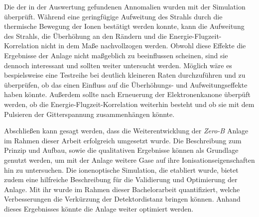Die der in der Auswertung gefundenen Annomalien wurden mit der Simulation überprüft. Während eine geringfügige Aufweitung des Strahls durch die thermische Bewegung der Ionen bestätigt werden konnte, kann die Aufweitung des Strahls, die Überhöhung an den Rändern und die Energie-Flugzeit-Korrelation nicht in dem Maße nachvollzogen werden. Obwohl diese Effekte die Ergebnisse der Anlage nicht maßgeblich zu beeinflussen scheinen, sind sie dennoch interessant und sollten weiter untersucht werden. Möglich wäre es bespielsweise eine Testreihe bei deutlich kleineren Raten durchzuführen und zu überprüfen, ob das einen Einfluss auf die Überhöhungs- und Aufweitungseffekte haben könnte. Außerdem sollte nach Erneuerung der Elektronenkanone überpüft werden, ob die Energie-Flugzeit-Korrelation weiterhin besteht und ob sie mit dem Pulsieren der Gitterspannung zusammenhängen könnte.

Abschließen kann gesagt werden, dass die Weiterentwicklung der \textit{Zero-B} Anlage im Rahmen dieser Arbeit erfolgreich umgesetzt wurde. Die Beschreibung zum Prinzip und Aufbau, sowie die qualitativen Ergebnisse können als Grundlage genutzt werden, um mit der Anlage weitere Gase auf ihre Ionisationseigenschaften hin zu untersuchen. Die ionenoptische Simulation, die etabliert wurde, bietet zudem eine hilfreiche Beschreibung für die Validierung und Optimierung der Anlage. Mit ihr wurde im Rahmen dieser Bachelorarbeit quantifiziert, welche Verbesserungen die Verkürzung der Detektordistanz bringen können. Anhand dieses Ergebnisses könnte die Anlage weiter optimiert werden. 

